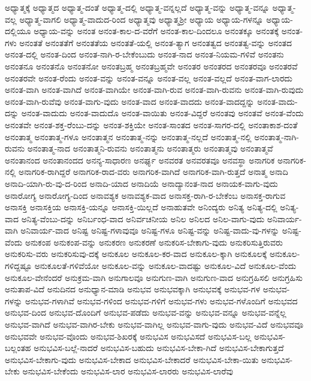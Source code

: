 {ಅಧ್ಯಾತ್ಮಕ್ಕೆ
ಅಧ್ಯಾತ್ಮದ
ಅಧ್ಯಾತ್ಮ-ದಂತೆ
ಅಧ್ಯಾತ್ಮ-ದಲ್ಲಿ
ಅಧ್ಯಾತ್ಮ-ವನ್ನಲ್ಲದೆ
ಅಧ್ಯಾತ್ಮ-ವನ್ನು
ಅಧ್ಯಾತ್ಮ-ವನ್ನೂ
ಅಧ್ಯಾತ್ಮ-ವಲ್ಲ
ಅಧ್ಯಾತ್ಮ-ವಾಗಲಿ
ಅಧ್ಯಾತ್ಮ-ವಾದುದ-ರಿಂದ
ಅಧ್ಯಾತ್ಮವು
ಅಧ್ಯಾತ್ಮಶ್ರೀ
ಅಧ್ಯಾಯ
ಅಧ್ಯಾಯ-ಗಳನ್ನೂ
ಅಧ್ಯಾಯ-ದಲ್ಲಿಯೂ
ಅಧ್ಯಾಯ-ವನ್ನು
ಅನಂತ
ಅನಂತ-ಕಾಲ-ದ-ವರೆಗೆ
ಅನಂತ-ಕಾಲ-ದಿಂದಲೂ
ಅನಂತಕ್ಕೂ
ಅನಂತಕ್ಕೆ
ಅನಂತ-ಗಳು
ಅನಂತತೆ
ಅನಂತತೆಗೆ
ಅನಂತತೆಯ
ಅನಂತತೆ-ಯಲ್ಲಿ
ಅನಂತ-ತ್ಯಾಗ
ಅನಂತತ್ವದ
ಅನಂತತ್ವ-ವನ್ನು
ಅನಂತದ
ಅನಂತ-ದಲ್ಲಿ
ಅನಂತ-ದಿಂದ
ಅನಂತ-ನಾಗಿ-ರ-ಬೇಕೆಂಬುದು
ಅನಂತ-ನಾದ
ಅನಂತ-ನಿಯಮ-ಗಳಿವೆ
ಅನಂತನು
ಅನಂತನೂ
ಅನಂತನೊ
ಅನಂತನೋ
ಅನಂತಬ್ರಹ್ಮ
ಅನಂತಬ್ರಹ್ಮವೇ
ಅನಂತರ
ಅನಂತರದ
ಅನಂತರವೂ
ಅನಂತರವೆ
ಅನಂತರವೇ
ಅನಂತ-ರೆಂದು
ಅನಂತ-ವನ್ನು
ಅನಂತ-ವನ್ನೂ
ಅನಂತ-ವಲ್ಲ
ಅನಂತ-ವಲ್ಲದೆ
ಅನಂತ-ವಾಗ-ಲಾರದು
ಅನಂತ-ವಾಗಿ
ಅನಂತ-ವಾಗಿದೆ
ಅನಂತ-ವಾಗಿಯೇ
ಅನಂತ-ವಾಗಿ-ರುವ
ಅನಂತ-ವಾಗಿ-ರುವನು
ಅನಂತ-ವಾಗಿ-ರುವುದು
ಅನಂತ-ವಾಗಿ-ರುವೆವು
ಅನಂತ-ವಾಗು-ವುದು
ಅನಂತ-ವಾದ
ಅನಂತ-ವಾದದು
ಅನಂತ-ವಾದದ್ದನ್ನು
ಅನಂತ-ವಾದು-ದನ್ನು
ಅನಂತ-ವಾದುದು
ಅನಂತ-ವಾದುದೊ
ಅನಂತ-ವಾಯಿತು
ಅನಂತ-ವಿದ್ದರೆ
ಅನಂತವು
ಅನಂತವೆ
ಅನಂತ-ವೆಂದು
ಅನಂತವೇ
ಅನಂತ-ಶಕ್ತ-ರೆಂಬು-ದನ್ನು
ಅನಂತ-ಶಕ್ತಿಯೇ
ಅನಂತ-ಸಾಂತದ
ಅನಂತ-ಸಾಗರ-ದಲ್ಲಿ
ಅನಂತಾಕಾಶ-ದಂತೆ
ಅನಂತಾತ್ಮ
ಅನಂತಾತ್ಮ-ಗಳೂ
ಅನಂತಾತ್ಮನ
ಅನಂತಾತ್ಮ-ನನ್ನು
ಅನಂತಾತ್ಮ-ನಲ್ಲದೆ
ಅನಂತಾತ್ಮ-ನಲ್ಲಿ
ಅನಂತಾತ್ಮ-ನಾಗಿ-ರುವನು
ಅನಂತಾತ್ಮ-ನಾದ
ಅನಂತಾತ್ಮನಿ-ರುವನು
ಅನಂತಾತ್ಮನು
ಅನಂತಾತ್ಮರು
ಅನಂತಾತ್ಮವು
ಅನಂತಾತ್ಮವೆ
ಅನಂತಾನಂದ
ಅನಂತಾನಂದದ
ಅನನ್ಯ-ಸಾಧಾರಣ
ಅನರ್ಘ್ಯ
ಅನವರತ
ಅನವರತವೂ
ಅನವಸ್ಥಾ
ಅನಾಗರಿಕ
ಅನಾಗರಿಕ-ನಲ್ಲಿ
ಅನಾಗರಿಕ-ರಾಗಿದ್ದರೆ
ಅನಾಗರಿಕ-ರಾದ-ವರು
ಅನಾಗರಿಕ-ವಾಗಿದೆ
ಅನಾಗರಿಕ-ವಾಗಿ-ರುತ್ತದೆ
ಅನಾತ್ಮ
ಅನಾದಿ
ಅನಾದಿ-ಯಾಗಿ-ರು-ವು-ದ-ರಿಂದ
ಅನಾದಿ-ಯಾದ
ಅನಾದಿಯೆ
ಅನಾದ್ಯಾನಂತ-ನಾದ
ಅನಾಯಕ-ವಾಗು-ವುದು
ಅನಾರೋಗ್ಯ
ಅನಾರೋಗ್ಯ-ದಿಂದ
ಅನಾವಶ್ಯಕ
ಅನಾವಶ್ಯಕ-ವಾದ
ಅನಾಸಕ್ತ-ರಾಗಿ-ರ-ಬೇಕೆಂಬ
ಅನಾಸಕ್ತ-ರಾಗುವ
ಅನಾಸಕ್ತಿ
ಅನಾಸಕ್ತಿಯ
ಅನಾಸಕ್ತಿ-ಯನ್ನೂ
ಅನಾಸಕ್ತಿ-ಯಿಲ್ಲದೆ
ಅನಾಹುತವೇ
ಅನಿಂದ್ಯರು
ಅನಿತ್ಯ
ಅನಿತ್ಯ-ದಲ್ಲಿ
ಅನಿತ್ಯ-ವಾದ
ಅನಿತ್ಯ-ವೆಂಬು-ದನ್ನು
ಅನಿರ್ಬಂಧ-ವಾದ
ಅನಿರ್ವಚನೀಯ
ಅನಿಲ
ಅನಿಲದ
ಅನಿಲ-ವಾಗು-ವುದು
ಅನಿವಾರ್ಯ-ವಾಗಿ
ಅನಿವಾರ್ಯ-ವಾದ
ಅನಿಷ್ಟ
ಅನಿಷ್ಟ-ಗಳಾವುವೂ
ಅನಿಷ್ಟ-ಗಳೂ
ಅನಿಷ್ಟ-ವನ್ನು
ಅನಿಷ್ಟ-ವಾದು-ವು-ಗಳನ್ನು
ಅನಿಷ್ಟ-ವೆಂದು
ಅನುಕಂಪ
ಅನುಕಂಪ-ವನ್ನು
ಅನುಕರಣ
ಅನುಕರಣೆ
ಅನುಕರಿಸ-ಬೇಕಾಗು-ವುದು
ಅನುಕರಿಸುತ್ತಿರುವರು
ಅನುಕರಿಸು-ವರು
ಅನುಕರಿಸುವು-ದಕ್ಕೆ
ಅನುಕೂಲ
ಅನುಕೂಲ-ಕರ-ವಾದ
ಅನುಕೂಲ-ಕ್ಕಾಗಿ
ಅನುಕೂಲಕ್ಕೆ
ಅನುಕೂಲ-ಗಳಿದ್ದಷ್ಟೂ
ಅನುಕೂಲತೆ-ಗಳಿವೆಯೋ
ಅನುಕೂಲ-ವನ್ನು
ಅನುಕೂಲ-ವಾದಷ್ಟು
ಅನುಕೂಲ-ವಿದೆ
ಅನುಕೂಲ-ವೆಂದು
ಅನುಕೂಲ-ವೇನೆಂದರೆ
ಅನುಕ್ರಮ-ವಾಗಿ
ಅನುಗಾಲವೂ
ಅನುಗುಣ-ವಾಗಿ
ಅನುಗುಣ-ವಾದ
ಅನುಗ್ರಹಿಸಲಿ
ಅನುಗ್ರಹಿಸು
ಅನುತಾಪ-ವಿದೆ
ಅನುದಿನದ
ಅನುಧ್ಯಾನ-ಮಾಡಿ
ಅನುಭವ
ಅನುಭವಕ್ಕಾಗಿ
ಅನುಭವಕ್ಕೆ
ಅನುಭವ-ಗಳ
ಅನುಭವ-ಗಳನ್ನು
ಅನುಭವ-ಗಳಾಗಿವೆ
ಅನುಭವ-ಗಳಿಂದ
ಅನುಭವ-ಗಳಿಗೆ
ಅನುಭವ-ಗಳು
ಅನುಭವ-ಗಳೊಂದಿಗೆ
ಅನುಭವದ
ಅನುಭವ-ದಿಂದ
ಅನುಭವ-ದೊಂದಿಗೆ
ಅನುಭವ-ಪಡೆದು
ಅನುಭವ-ವನ್ನು
ಅನುಭವ-ವನ್ನೂ
ಅನುಭವ-ವನ್ನೆಲ್ಲ
ಅನುಭವ-ವಾಗಿದೆ
ಅನುಭವ-ವಾಗಿರ-ಬೇಕು
ಅನುಭವ-ವಾಗಿಲ್ಲ
ಅನುಭವ-ವಾಗು-ವುದು
ಅನುಭವ-ವಿದೆ
ಅನುಭವವೂ
ಅನುಭವವೇ
ಅನುಭವ-ವೊಂದು
ಅನುಭವ-ಶಿಖರಕ್ಕೆ
ಅನುಭವಿಸ
ಅನುಭವಿಸದೆ
ಅನುಭವಿಸ-ಬಲ್ಲ
ಅನುಭವಿಸ-ಬಲ್ಲಂತಹ
ಅನುಭವಿಸ-ಬಲ್ಲೆ-ನಾದರೆ
ಅನುಭವಿಸ-ಬಹುದು
ಅನುಭವಿಸ-ಬೇಕಾ-ಗಿದೆ
ಅನುಭವಿಸ-ಬೇಕಾಗುತ್ತದೆ
ಅನುಭವಿಸ-ಬೇಕಾಗು-ವುದು
ಅನುಭವಿಸ-ಬೇಕಾದ
ಅನುಭವಿಸ-ಬೇಕಾದರೆ
ಅನುಭವಿಸ-ಬೇಕಾ-ಯಿತು
ಅನುಭವಿಸ-ಬೇಕು
ಅನುಭವಿಸ-ಬೇಕೆಂದು
ಅನುಭವಿಸ-ಲಾರ
ಅನುಭವಿಸ-ಲಾರರು
ಅನುಭವಿಸ-ಲಾರೆವು
}
